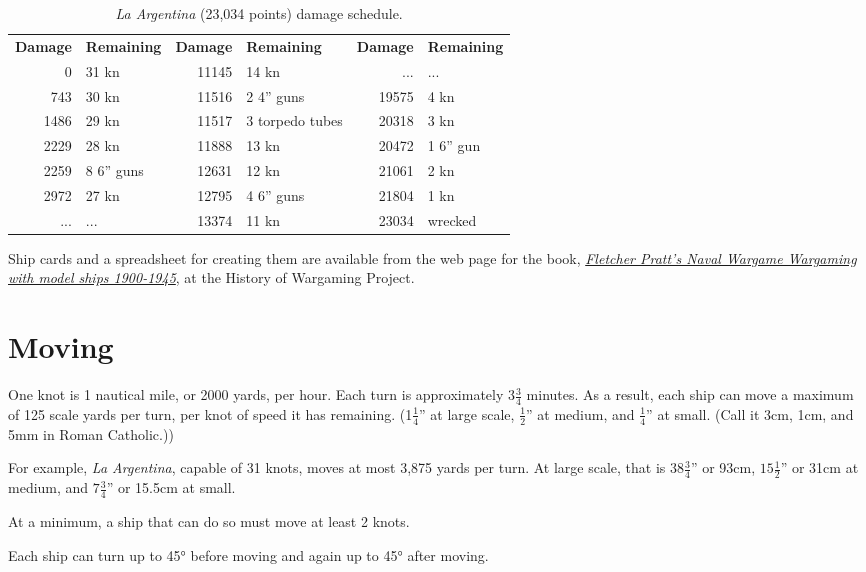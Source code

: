 \documentclass[twocolumn]{article}
\begin{document}
\begin{table*}
  \caption{\emph{La Argentina} (23,034 points) damage schedule.}
  \label{laargentinadamageschedule}
  \centering
  \begin{tabular}{rl|rl|rl}
   \textbf{Damage} & \textbf{Remaining} & \textbf{Damage} & \textbf{Remaining} & \textbf{Damage} & \textbf{Remaining} \\
      0 & 31 kn      & 11145 & 14 kn           & ...   & ...  \\
    743 & 30 kn      & 11516 & 2 4'' guns      & 19575 & 4 kn \\
   1486 & 29 kn      & 11517 & 3 torpedo tubes & 20318 & 3 kn \\
   2229 & 28 kn      & 11888 & 13 kn           & 20472 & 1 6'' gun \\
   2259 & 8 6'' guns & 12631 & 12 kn           & 21061 & 2 kn \\
   2972 & 27 kn      & 12795 & 4 6'' guns      & 21804 & 1 kn \\
   ...  & ...        & 13374 & 11 kn           & 23034 & wrecked
  \end{tabular}
\end{table*}

Ship cards and a spreadsheet for creating them are available from the web page for the book, 
\href{http://www.wargaming.co/recreation/details/fpnaval.htm}
  {\emph{Fletcher Pratt's Naval Wargame Wargaming with model ships 1900-1945}},
at the History of Wargaming Project.

\section{Moving}

One knot is 1 nautical mile, or 2000 yards, per hour. Each turn is
approximately 3$\frac{3}{4}$ minutes. As a result, each ship can
move a maximum of 125 scale yards per turn, per knot of speed it has
remaining. (1$\frac{1}{4}$'' at large scale, $\frac{1}{2}$'' at medium,
and $\frac{1}{4}$'' at small. (Call it 3cm, 1cm, and 5mm in Roman
Catholic.))

For example, \emph{La Argentina}, capable of 31 knots, moves at most
3,875 yards per turn. At large scale, that is $38\frac{3}{4}$'' or 93cm,
$15\frac{1}{2}$'' or 31cm at medium, and $7\frac{3}{4}$'' or 15.5cm at
small.

At a minimum, a ship that can do so must move at least 2 knots.

Each ship can turn up to \ang{45} before moving and again up to \ang{45} after
moving.
\end{document}
